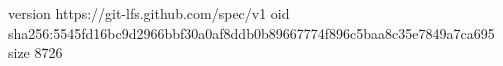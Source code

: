 version https://git-lfs.github.com/spec/v1
oid sha256:5545fd16bc9d2966bbf30a0af8ddb0b89667774f896c5baa8c35e7849a7ca695
size 8726
